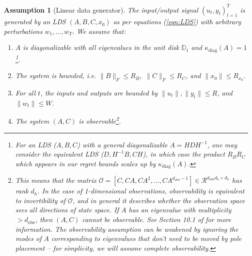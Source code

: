 \documentclass[11pt]{article}
\newcommand{\evannote}[1]{\textcolor{red}{\{evan: #1\}}}
\def\R{{\mathcal R}}
\def\R{\ensuremath{\mathcal R}}
\newtheorem{assumption}[theorem]{Assumption}
\numberwithin{equation}{section}
\begin{document}
\begin{assumption}[Linear data generator]
\label{definition:linear_realizable}
    The input/output signal $(u_t, y_t)_{t=1}^T$ is generated by an LDS $(A, B, C, x_0)$ as per equations (\ref{eqn:LDS}) with arbitrary perturbations $w_1, \ldots, w_T$. We assume that:
    \begin{enumerate}
    \item[(i)] $A$ is diagonalizable with all eigenvalues in the unit disk $\mathbb{D}_1$ and $\kappa_{\textrm{diag}}(A) = 1$\footnote{For an LDS ($A,B,C$) with a general diagonalizable $A=HDH^{-1}$, one may consider the equivalent LDS ($D,H^{-1}B,CH$), in which case the product $R_BR_C$ which appears in our regret bounds scales up by $\kappa_{\textrm{diag}}(A)$.}.
    \item[(ii)] The system is bounded, i.e. $\|B\|_F\leq R_B,$ $\|C\|_F \leq R_C$, and $\|x_0\| \leq R_{x_0}$.
    \item[(iii)] For all $t$, the inputs and outputs are bounded by $\|u_t\|,\|y_t\| \leq R$, and $\|w_t\| \leq W$. %
    \item[(iv)] The system $(A, C)$ is observable\footnote{This means that the matrix $\mathcal{O} = [C,CA,CA^{2},\ldots, CA^{d_{\text{obs}}-1}] \in \R^{d_\text{obs} d_h \times d_h}$ has rank $d_h$. In the case of 1-dimensional observations, observability is equivalent to invertibility of $\mathcal{O}$, and in general it describes whether the observation space sees all directions of state space. If $A$ has an eigenvalue with  multiplicity $> d_{\textrm{obs}}$, then $(A, C)$ cannot be observable. See Section 10.1 of \cite{hazan2025introductiononlinecontrol} for more information. The observability assumption can be weakened by ignoring the modes of $A$ corresponding to eigenvalues that don't need to be moved by pole placement -- for simplicity, we will assume complete observability.}.  
    \end{enumerate}
    
\end{assumption}
\end{document}
